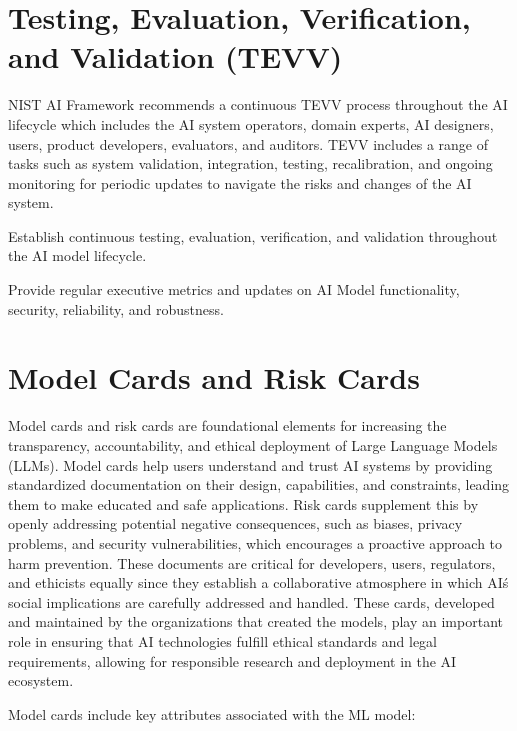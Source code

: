 \section{Testing, Evaluation, Verification, and Validation (TEVV)}
NIST AI Framework recommends a continuous TEVV process throughout the AI
lifecycle which includes the AI system operators, domain experts, AI designers,
users, product developers, evaluators, and auditors. TEVV includes a range of
tasks such as system validation, integration, testing, recalibration, and
ongoing monitoring for periodic updates to navigate the risks and changes of
the AI system.

\begin{minipage}{\linewidth}
\begin{checklist}
  \item Establish continuous testing, evaluation, verification, and validation
  throughout the AI model lifecycle.
  \item Provide regular executive metrics and updates on AI Model functionality,
  security, reliability, and robustness.
\end{checklist}
\end{minipage}

\clearpage

\section{Model Cards and Risk Cards}
Model cards and risk cards are foundational elements for increasing the
transparency, accountability, and ethical deployment of Large Language Models
(LLMs). Model cards help users understand and trust AI systems by providing
standardized documentation on their design, capabilities, and constraints,
leading them to make educated and safe applications. Risk cards supplement this
by openly addressing potential negative consequences, such as biases, privacy
problems, and security vulnerabilities, which encourages a proactive approach
to harm prevention. These documents are critical for developers, users,
regulators, and ethicists equally since they establish a collaborative
atmosphere in which AI\'s social implications are carefully addressed and
handled. These cards, developed and maintained by the organizations that
created the models, play an important role in ensuring that AI technologies
fulfill ethical standards and legal requirements, allowing for responsible
research and deployment in the AI ecosystem.

Model cards include key attributes associated with the ML model:

